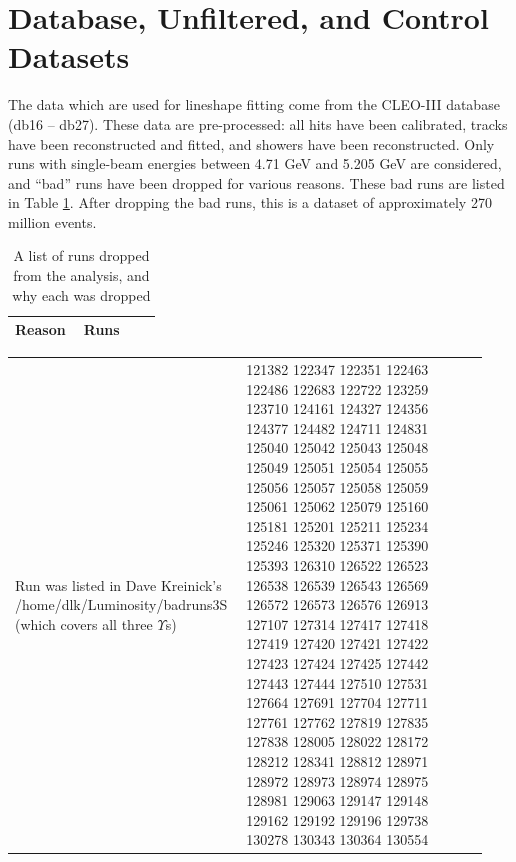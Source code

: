 \section{Database, Unfiltered, and Control Datasets}

The data which are used for lineshape fitting come from the CLEO-III
database (db16 -- db27).  These data are pre-processed: all hits have
been calibrated, tracks have been reconstructed and fitted, and
showers have been reconstructed.  Only runs with single-beam energies
between 4.71 GeV and 5.205 GeV are considered, and ``bad'' runs have
been dropped for various reasons.  These bad runs are listed in Table
\ref{datasets:badruns}.  After dropping the bad runs, this is a
dataset of approximately 270 million events.

\begin{table}[p]
  \caption{\label{datasets:badruns} A list of runs dropped
    from the analysis, and why each was dropped}

  \vspace{0.5 cm}
  \noindent \begin{tabular}{p{0.44\linewidth} p{0.50\linewidth}}
    Reason & Runs \\\hline
  \end{tabular}
  \vspace{-1 cm}
\end{table}

\begin{table}[p]
  \noindent \begin{tabular}{p{0.44\linewidth} p{0.50\linewidth}}
  Run was listed in Dave Kreinick's /home/dlk/Luminosity/badruns3S
  (which covers all three $\Upsilon$s) &
  121382 122347 122351 122463 122486 122683 122722 123259 123710
  124161 124327 124356 124377 124482 124711 124831 125040 125042
  125043 125048 125049 125051 125054 125055 125056 125057 125058
  125059 125061 125062 125079 125160 125181 125201 125211 125234
  125246 125320 125371 125390 125393 126310 126522 126523 126538
  126539 126543 126569 126572 126573 126576 126913 127107 127314
  127417 127418 127419 127420 127421 127422 127423 127424 127425
  127442 127443 127444 127510 127531 127664 127691 127704 127711
  127761 127762 127819 127835 127838 128005 128022 128172 128212
  128341 128812 128971 128972 128973 128974 128975 128981 129063
  129147 129148 129162 129192 129196 129738 130278 130343 130364
  130554 \mbox{\hspace{1 cm}} \\
  \end{tabular}
\end{table}

